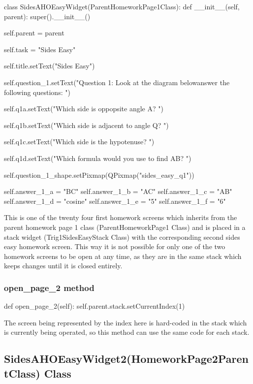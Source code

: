 \begin{python}
class SidesAHOEasyWidget(ParentHomeworkPage1Class):
    def __init__(self, parent):
        super().__init__()

        self.parent = parent

        self.task = "Sides Easy"
        
        self.title.setText("Sides Easy")

        self.question_1.setText("Question 1: Look at the diagram below\nand answer the following questions: ")
        
        self.q1a.setText("Which side is oppopsite angle A? ")
    
        self.q1b.setText("Which side is adjacent to angle Q? ")
                
        self.q1c.setText("Which side is the hypotenuse? ")        

        self.q1d.setText("Which formula would you use to find AB? ")
        
        self.question_1_shape.setPixmap(QPixmap("sides_easy_q1"))

        self.answer_1_a = "BC"
        self.answer_1_b = "AC"
        self.answer_1_c = "AB"
        self.answer_1_d = "cosine"
        self.answer_1_e = "5"
        self.answer_1_f = "6"
\end{python}

This is one of the twenty four first homework screens which inherits from the parent homework page 1 class (ParentHomeworkPage1 Class) and is placed in a stack widget (Trig1SidesEasyStack Class) with the corresponding second sides easy homework screen. This way it is not possible for only one of the two homework screens to be open at any time, as they are in the same stack which keeps changes until it is closed entirely.

\subsubsection{open\_page\_2 method}

\begin{python}
def open_page_2(self):
        self.parent.stack.setCurrentIndex(1)
\end{python}

The screen being represented by the index here is hard-coded in the stack which is currently being operated, so this method can use the same code for each stack.

\subsection{SidesAHOEasyWidget2(HomeworkPage2ParentClass) Class}

